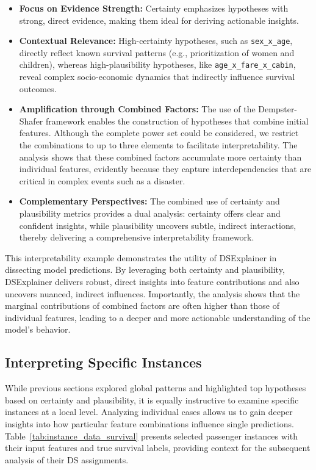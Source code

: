 \documentclass[acmlarge]{acmart}
\begin{document}
\begin{itemize}
    \item \textbf{Focus on Evidence Strength:} Certainty emphasizes hypotheses with strong, direct evidence, making them ideal for deriving actionable insights.
    \item \textbf{Contextual Relevance:} High-certainty hypotheses, such as \texttt{sex\_x\_age}, directly reflect known survival patterns (e.g., prioritization of women and children), whereas high-plausibility hypotheses, like \texttt{age\_x\_fare\_x\_cabin}, reveal complex socio-economic dynamics that indirectly influence survival outcomes.
    \item \textbf{Amplification through Combined Factors:} The use of the Dempster-Shafer framework enables the construction of hypotheses that combine initial features. Although the complete power set could be considered, we restrict the combinations to up to three elements to facilitate interpretability. The analysis shows that these combined factors accumulate more certainty than individual features, evidently because they capture interdependencies that are critical in complex events such as a disaster.
    \item \textbf{Complementary Perspectives:} The combined use of certainty and plausibility metrics provides a dual analysis: certainty offers clear and confident insights, while plausibility uncovers subtle, indirect interactions, thereby delivering a comprehensive interpretability framework.
\end{itemize}

This interpretability example demonstrates the utility of DSExplainer in dissecting model predictions. By leveraging both certainty and plausibility, DSExplainer delivers robust, direct insights into feature contributions and also uncovers nuanced, indirect influences. Importantly, the analysis shows that the marginal contributions of combined factors are often higher than those of individual features, leading to a deeper and more actionable understanding of the model's behavior.




\subsection{Interpreting Specific Instances}

While previous sections explored global patterns and highlighted top hypotheses based on certainty and plausibility, it is equally instructive to examine specific instances at a local level. Analyzing individual cases allows us to gain deeper insights into how particular feature combinations influence single predictions. Table~\ref{tab:instance_data_survival} presents selected passenger instances with their input features and true survival labels, providing context for the subsequent analysis of their DS assignments.
\end{document}
